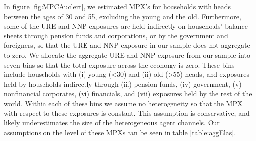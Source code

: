 \documentclass[titlepage]{\econtex}\newcommand{\texname}{ConsumptionHeterogeneity}
\begin{document}
	In figure \ref{fig:MPCAuclert}, we estimated MPX's for households with heads between the ages of 30 and 55, excluding the young and the old. Furthermore, some of the URE and NNP exposures are held indirectly on households' balance sheets through pension funds and corporations, or by the government and foreigners, so that the URE and NNP exposure in our sample does not aggregate to zero. We allocate the aggregate URE and NNP exposure from our sample into seven bins so that the total exposure across the economy is zero. These bins include households with (i) young (<30) and (ii) old (>55) heads, and exposures held by households indirectly through (iii) pension funds, (iv) government, (v) nonfinancial corporates, (vi) financials, and (vii) exposures held by the rest of the world. Within each of these bins we assume no heterogeneity so that the MPX with respect to these exposures is constant. This assumption is conservative, and likely underestimates the size of the heterogeneous agent channels. Our assumptions on the level of these MPXs can be seen in table \ref{table:aggElas}.
	
\end{document}
